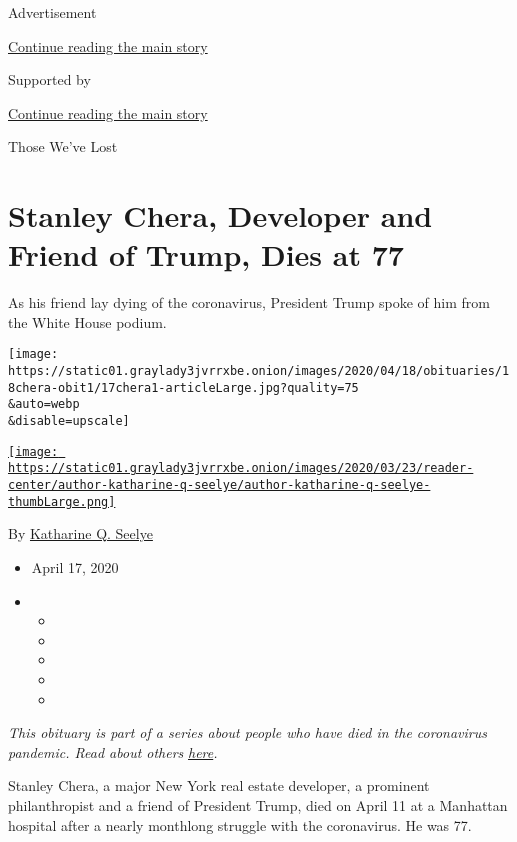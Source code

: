 Advertisement

\protect\hyperlink{after-top}{Continue reading the main story}

Supported by

\protect\hyperlink{after-sponsor}{Continue reading the main story}

Those We've Lost

\hypertarget{stanley-chera-developer-and-friend-of-trump-dies-at-77}{%
\section{Stanley Chera, Developer and Friend of Trump, Dies at
77}\label{stanley-chera-developer-and-friend-of-trump-dies-at-77}}

As his friend lay dying of the coronavirus, President Trump spoke of him
from the White House podium.

\texttt{[image: https://static01.graylady3jvrrxbe.onion/images/2020/04/18/obituaries/18chera-obit1/17chera1-articleLarge.jpg?quality=75\\\&auto=webp\\\&disable=upscale]}

\href{https://www.nytimes3xbfgragh.onion/by/katharine-q-seelye}{\texttt{[image: https://static01.graylady3jvrrxbe.onion/images/2020/03/23/reader-center/author-katharine-q-seelye/author-katharine-q-seelye-thumbLarge.png]}}

By
\href{https://www.nytimes3xbfgragh.onion/by/katharine-q-seelye}{Katharine
Q. Seelye}

\begin{itemize}
\item
  April 17, 2020
\item
  \begin{itemize}
  \item
  \item
  \item
  \item
  \item
  \end{itemize}
\end{itemize}

\emph{This obituary is part of a series about people who have died in
the coronavirus pandemic. Read about others}
\href{https://www.nytimes3xbfgragh.onion/series/people-who-have-died-of-the-coronavirus}{\emph{here}}\emph{.}

Stanley Chera, a major New York real estate developer, a prominent
philanthropist and a friend of President Trump, died on April 11 at a
Manhattan hospital after a nearly monthlong struggle with the
coronavirus. He was 77.


